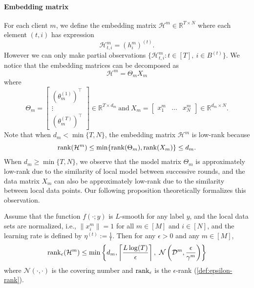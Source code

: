 \paragraph{Embedding matrix}
For each client $m$, we define the embedding matrix $\mathcal{H}^m \in \mathbb{R}^{T \times N}$ where each element $(t,i)$ has expression
\[\mathcal{H}_{t,i}^m = (h_i^m)^{(t)}.\]
However we can only make partial observations $\{\mathcal{H}^m_{t, i}: t \in [T], ~i \in B^{(t)}\}$. We notice that the embedding matrices can be decomposed as 
\[
  \mathcal{H}^m = \Theta_m X_m 
\]  
where
\[
  \Theta_m = \begin{bmatrix}
 (\theta_m^{(1)})^\intercal \\
 \vdots           \\
 (\theta_m^{(T)})^\intercal
  \end{bmatrix} \in \mathbb{R}^{T \times d_m}
  ~\text{and}~
  X_m = \begin{bmatrix}
    x_1^m  & \dots  & x_N^m 
  \end{bmatrix} \in \mathbb{R}^{d_m \times N}.
\]
Note that when $d_m < \min\{T, N\}$, the embedding matrix $\mathcal{H}^m$ is low-rank because
\[\operatorname{rank}(\mathcal{H}^m) \leq \min\{\operatorname{rank}(\Theta_m), \operatorname{rank}(X_m)\} \leq d_m.\]
When $d_m \geq \min\{T, N\}$, we observe that the model matrix $\Theta_m$ is approximately low-rank due to the similarity of local model between successive rounds, and the data matrix $X_m$ can also be approximately low-rank due to the similarity between local data points. Our following proposition theoretically formalizes this observation. 

\begin{proposition} \label{prop:low-rank}
    Assume that the function $f(\cdot; y)$ is $L$-smooth for any label $y$, and the local data sets are normalized, i.e., $\|x^m_i\| = 1$ for all $m \in [M]$ and $i \in [N]$, and the learning rate is defined by $\eta^{(t)} := \frac{1}{t}$. 
    Then for any $\epsilon>0$ and any $m\in[M]$, 
    \begin{equation} \label{eq:epsilon_rank_u}
        \operatorname{rank}_{\epsilon}(\mathcal{H}^m) \leq \min\left\{ d_m, \left\lceil \frac{L\log(T)}{\epsilon} \right\rceil, ~\mathcal{N}\left(\mathcal{D}^m, \frac{\epsilon}{\gamma^m}\right) \right\}
    \end{equation} 
    where $\mathcal{N}(\cdot, \cdot)$ is the covering number and $\operatorname{rank}_{\epsilon}$ is the $\epsilon$-rank (\autoref{def:epsilon-rank}).  
\end{proposition}


